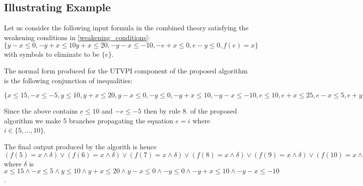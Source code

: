 \subsection{Illustrating 
Example}

Let us consider the following input formula in the
combined theory satisfying the weakening conditions in 
\ref{weakening_conditions}: $\{y - x \leq 0 , -y + x \leq 10
y + x \leq 20, -y - x \leq -10, -e + x \leq 0, e - y \leq 0, f(e) = x\}$ with symbols to eliminate to be $\{e\}$.

The normal form produced for the UTVPI component of the
proposed algorithm is the following
conjunction of inequalities:

$\{
  x \leq 15,
  -x \leq -5,
  y \leq 10,
  y + x \leq 20,
  y - x \leq 0,
  -y \leq 0,
  -y + x \leq 10,
  -y - x \leq -10,
  e \leq 10,
  e + x \leq 25,
  e - x \leq 5,
  e + y \leq 20,
  e - y \leq 10,
  -e \leq -5,
  -e + x \leq 10,
  -e - x\leq -10,
  -e + y \leq 5,
  -e - \leq -5
  \}$

Since the above contains $e \leq 10$ and $-e \leq -5$
then by rule 8. of the proposed algorithm we make 5 
branches propagating the equation $e = i$ where 
$i \in \{5, \dots, 10\}$.

The final output produced by the algorith is hence
$(f(5) = x \land \delta) \lor (f(6) = x \land \delta)
\lor (f(7) = x \land \delta)
\lor (f(8) = x \land \delta)
\lor (f(9) = x \land \delta)
\lor (f(10) = x \land \delta)
$ where $\delta$ is 
$x \leq 15 
\land -x \leq 5 
\land y \leq 10 
\land y + x \leq 20
\land y - x \leq 0
\land -y \leq 0
\land -y + x \leq 10
\land -y - x \leq -10$.

